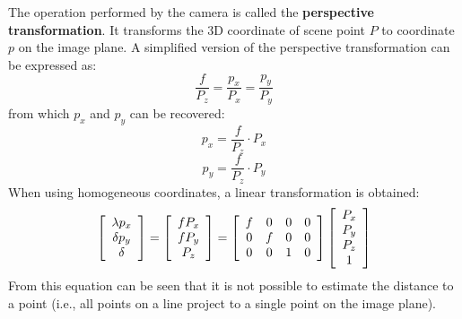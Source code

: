 The operation performed by the camera is called the \textbf{perspective transformation}.
It transforms the 3D coordinate of scene point $P$ to coordinate $p$ on the image plane.
A simplified version of the perspective transformation can be expressed as:
\begin{equation}
\frac{f}{P_z} = \frac{p_x}{P_x} = \frac{p_y}{P_y}
\end{equation}
from which $p_x$ and $p_y$ can be recovered:
\begin{equation}
p_x = \frac{f}{P_z} \cdot P_x
\end{equation}
\begin{equation}
p_y = \frac{f}{P_z} \cdot P_y
\end{equation}
When using homogeneous coordinates, a linear transformation is obtained:
\begin{equation}
\left[ \begin{array}{c}
\lambda p_x \\
\delta p_y \\
\delta
\end{array} \right]
=
\left[ \begin{array}{c}
f P_x \\
f P_y \\
P_z
\end{array} \right]
=
\left[ \begin{array}{c c c c}
f & 0 & 0 & 0  \\
0 & f & 0 & 0 \\
0 & 0 & 1 & 0
\end{array} \right]
\left[ \begin{array}{c}
P_x \\
P_y \\
P_z \\
1
\end{array} \right]
\end{equation}
From this equation can be seen that it is not possible to estimate the distance to a point (i.e., all points on a line project to a single point on the image plane).

